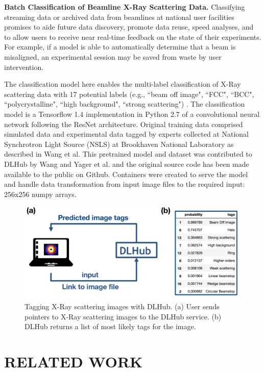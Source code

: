 \documentclass{aip-cp}
\begin{document}
\textbf{Batch Classification of Beamline X-Ray Scattering Data.}
Classifying streaming data or archived data from beamlines at national user
facilities promises to aide future data discovery, promote data reuse, speed
analyses, and to allow users to receive near real-time feedback on the state
of their experiments. For example, if a model is able to automatically
determine that a beam is misaligned, an experimental session may be saved from
waste by user intervention.

The classification model here enables the multi-label classification of X-Ray
scattering data with 17 potential labels (e.g., ``beam off image", ``FCC",
``BCC", ``polycrystalline", ``high background", ``strong scattering") \cite{wang2017x}. The
classification model is a Tensorflow 1.4 implementation in Python 2.7 of a
convolutional neural network following the ResNet architecture. Original
training data comprised simulated data and experimental data tagged by experts
collected at National Synchrotron Light Source (NSLS) at Brookhaven National
Laboratory as described in Wang et al. This pretrained model and dataset was
contributed to DLHub by Wang and Yager et al. and the original source code has
been made available to the public on Github\cite{wang2017xcode}. Containers were created to serve
the model and handle data transformation from input image files to the
required input: 256x256 numpy arrays.

\begin{figure}[h]
  \centerline{\includegraphics[width=5in]{Figs/DLHub-BNL.png}}
  \caption{Tagging X-Ray scattering images with DLHub. (a) User sends pointers to X-Ray scattering images to the DLHub service. (b) DLHub returns a list of most likely tags for the image.
\label{fig:dlhub-bnl}}
\end{figure}

\section{RELATED WORK}
\end{document}
